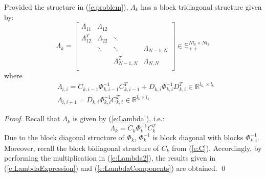 \begin{proposition}
Provided the structure in (\ref{e:problem}), $\Lambda_k$ has a block tridiagonal structure given by:
\begin{equation} \label{e:LambdaExpression}
\Lambda_k = \left[ \begin{array}{cccc} 
\Lambda_{11} &  \Lambda_{12} &   &  \\
\Lambda_{12}^T &  \Lambda_{22} & \ddots  &  \\
  &  \ddots & \ddots  & \Lambda_{N-1,N} \\
    &   & \Lambda_{N-1,N}^T  & \Lambda_{N,N} \\
\end{array} \right] \in \mathbb{S}_{++}^{N l_{k} \times N l_{k}}
\end{equation}
where
\begin{subequations}
\label{e:LambdaComponents}
\begin{align}
& \Lambda_{i,i} = C_{k,i-1}\Phi_{k,i-1}^{-1}C_{k,i-1}^T + D_{k,i}\Phi_{k,i}^{-1}D_{k,i}^T \in \mathbb{R}^{l_{k,} \times l_{k}} \\
& \Lambda_{i,i+1} = D_{k,i} \Phi_{k,i}^{-1}C_{k,i}^T \in \mathbb{R}^{l_{k} \times l_{k}}
\end{align}
\end{subequations}
\end{proposition}
\begin{proof}
Recall that $\Lambda_k$ is given by (\ref{e:Lambda}), i.e.:
\begin{equation} \label{e:Lambda2}
\Lambda_k = C_k \Phi_k^{-1} C_k^T
\end{equation}
Due to the block diagonal structure of $\Phi_k$,  $\Phi_k^{-1}$ is block diagonal with blocks $\Phi_{k,i}^{-1}$. Moreover, recall the block bidiagonal structure of $C_k$ from (\ref{e:C}). Accordingly, by performing the multiplication in (\ref{e:Lambda2}), the results given in (\ref{e:LambdaExpression}) and (\ref{e:LambdaComponents}) are obtained.
\qed
\end{proof}


